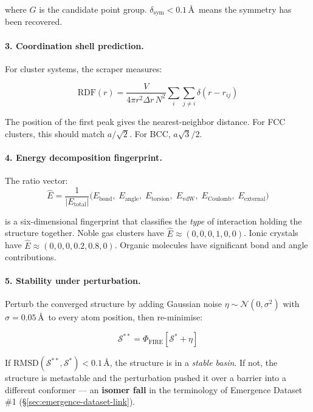 \documentclass[11pt, a4paper, oneside]{article}
\theoremstyle{definition}
\theoremstyle{remark}
\begin{document}
where $G$ is the candidate point group.  $\delta_{\text{sym}} < 0.1$\,\AA\
means the symmetry has been recovered.

\paragraph{3. Coordination shell prediction.}

For cluster systems, the scraper measures:

\begin{equation}
\text{RDF}(r) = \frac{V}{4\pi r^2 \Delta r \, N^2}
  \sum_i \sum_{j \neq i} \delta(r - r_{ij})
\end{equation}

The position of the first peak gives the nearest-neighbor distance.
For FCC clusters, this should match $a/\sqrt{2}$.  For BCC, $a\sqrt{3}/2$.

\paragraph{4. Energy decomposition fingerprint.}

The ratio vector:
\begin{equation}
\hat{E} = \frac{1}{|E_{\text{total}}|}
  \bigl(E_{\text{bond}},\; E_{\text{angle}},\; E_{\text{torsion}},\;
   E_{\text{vdW}},\; E_{\text{Coulomb}},\; E_{\text{external}}\bigr)
\end{equation}

is a six-dimensional fingerprint that classifies the \textit{type} of
interaction holding the structure together.  Noble gas clusters have
$\hat{E} \approx (0,0,0,1,0,0)$.  Ionic crystals have
$\hat{E} \approx (0,0,0,0.2,0.8,0)$.  Organic molecules have
significant bond and angle contributions.

\paragraph{5. Stability under perturbation.}

Perturb the converged structure by adding Gaussian noise
$\eta \sim \mathcal{N}(0, \sigma^2)$ with $\sigma = 0.05$\,\AA\
to every atom position, then re-minimise:

\begin{equation}
\mathcal{S}^{**} = \Phi_{\text{FIRE}}[\mathcal{S}^* + \eta]
\end{equation}

If $\text{RMSD}(\mathcal{S}^{**}, \mathcal{S}^*) < 0.1$\,\AA, the
structure is in a \textit{stable basin}.  If not, the structure is
metastable and the perturbation pushed it over a barrier into a
different conformer — an \textbf{isomer fall} in the terminology of
Emergence Dataset \#1 (\S\ref{sec:emergence-dataset-link}).
\end{document}
